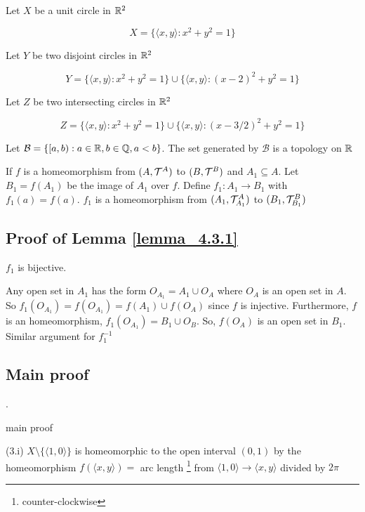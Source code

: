 \documentclass{article}
\begin{document}
\begin{definition}

Let $X$ be a unit circle in $\mathbb{R}^2$

$$
    X = \{ \langle x,y \rangle: x^2 + y^2 = 1 \}
$$

Let $Y$ be two disjoint circles in $\mathbb{R}^2$

$$
    Y = \{ \langle x,y \rangle: x^2 + y^2 = 1 \} \cup \{ \langle x, y\rangle: (x-2)^2 + y^2 = 1 \}
$$

Let $Z$ be two intersecting circles in $\mathbb{R}^2$

$$
    Z = \{ \langle x,y \rangle: x^2 + y^2 = 1 \} \cup \{ \langle x, y\rangle: (x-3/2)^2 + y^2 = 1 \}
$$
\end{definition}

\begin{definition}
    Let $\mathcal{B} = \{ [a, b): a \in \mathbb{R}, b \in \mathbb{Q}, a < b\}$. The set generated by $\mathcal{B}$ is a topology on $\mathbb{R}$
\end{definition}

\begin{lemma}
    \label{lemma_4.3.1}
    If $f$ is a homeomorphism from $(A, \mathcal{T}^A)$ to $(B, \mathcal{T}^B)$ and $A_1 \subseteq A$. Let $B_1 = f(A_1)$ be the image of $A_1$ over $f$. Define $f_1: A_1 \to B_1$ with $f_1(a) = f(a)$. $f_1$ is a homeomorphism from $(A_1, \mathcal{T}^A_{A_1})$ to $(B_1, \mathcal{T}^B_{B_1})$
\end{lemma}

\subsection*{Proof of Lemma \ref{lemma_4.3.1}}
    $f_1$ is bijective.

    Any open set in $A_1$ has the form $O_{A_1} = A_1 \cup O_A$ where $O_A$ is an open set in $A$. So $f_1(O_{A_1}) = f(O_{A_1}) = f(A_1) \cup f(O_A)$ since $f$ is injective. Furthermore, $f$ is an homeomorphism, $f_1(O_{A_1}) = B_1 \cup O_B$. So, $f(O_A)$ is an open set in $B_1$. Similar argument for $f_1^{-1}$
\subsection*{Main proof} .

main proof

(3.i) $X \setminus \{ \langle 1, 0\rangle\}$ is homeomorphic to the open interval $(0, 1)$ by the homeomorphism $f(\langle x, y\rangle) =$ arc length \footnote{counter-clockwise} from $\langle 1, 0\rangle \to \langle x, y\rangle$ divided by $2\pi$
\end{document}
